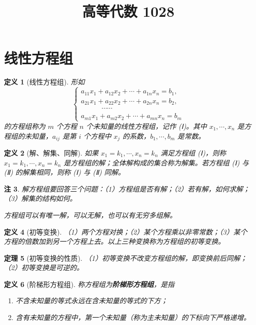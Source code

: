 \documentclass[UTF8,11pt]{ctexart}
\title{高等代数 1028}
\date{}
\theoremstyle{cnthm}
\newtheorem{thm}{定理}[section]
\newtheorem{defn}[thm]{定义}
\newtheorem{rem}[thm]{注}
\begin{document}
\maketitle

\section{线性方程组}

\begin{defn}[线性方程组]
形如
\[
\begin{cases}
a_{11}x_1 + a_{12}x_2 + \cdots + a_{1n}x_n = b_1,\\
a_{21}x_1 + a_{22}x_2 + \cdots + a_{2n}x_n = b_2,\\
\qquad\quad \cdots\cdots\\
a_{m1}x_1 + a_{m2}x_2 + \cdots + a_{mn}x_n = b_m
\end{cases}
\]
的方程组称为 $m$ 个方程 $n$ 个未知量的线性方程组，记作 (Ⅰ)。其中 $x_1,\cdots,x_n$ 是方程组的未知量，$a_{ij}$ 是第 $i$ 个方程中 $x_j$ 的系数，$b_1,\cdots,b_m$ 是常数。
\end{defn}

\begin{defn}[解、解集、同解]
如果 $x_1=k_1,\cdots,x_n=k_n$ 满足方程组 (Ⅰ)，则称 $x_1=k_1,\cdots,x_n=k_n$ 是方程组的解；全体解构成的集合称为解集。若方程组 (Ⅰ) 与 (Ⅱ) 的解集相同，则称 (Ⅰ) 与 (Ⅱ) 同解。
\end{defn}

\begin{rem}
解方程组要回答三个问题：（1）方程组是否有解；（2）若有解，如何求解；（3）解集的结构如何。

方程组可以有唯一解，可以无解，也可以有无穷多组解。
\end{rem}

\begin{defn}[初等变换]
（1）两个方程对换；（2）某个方程乘以非零常数；（3）某个方程的倍数加到另一个方程上去。以上三种变换称为方程组的初等变换。
\end{defn}

\begin{thm}[初等变换的性质]
（1）初等变换不改变方程组的解，即变换前后同解；
（2）初等变换是可逆的。
\end{thm}

\begin{defn}[阶梯形方程组]
称方程组为\textbf{阶梯形方程组}，是指
\begin{enumerate}
\item 不含未知量的等式永远在含未知量的等式的下方；
\item 含有未知量的方程中，第一个未知量（称为主未知量）的下标向下严格递增。
\end{enumerate}
\end{defn}
\end{document}
